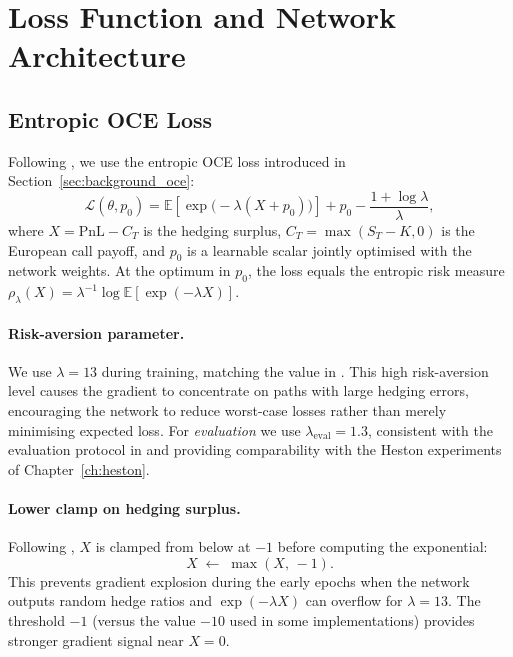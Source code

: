 \section{Loss Function and Network Architecture}%
\label{sec:gad_loss}

\subsection{Entropic OCE Loss}

Following \citet{he2025}, we use the entropic OCE loss introduced in
Section~\ref{sec:background_oce}:
\begin{equation}
  \mathcal{L}(\theta, p_0)
  = \mathbb{E}\!\left[\exp\!\bigl(-\lambda(X + p_0)\bigr)\right]
    + p_0 - \frac{1 + \log\lambda}{\lambda},
  \label{eq:gad_oce_loss}
\end{equation}
where $X = \mathrm{PnL} - C_T$ is the hedging surplus,
$C_T = \max(S_T - K, 0)$ is the European call payoff, and $p_0$ is a
learnable scalar jointly optimised with the network weights.  At the
optimum in $p_0$, the loss equals the entropic risk measure
$\rho_\lambda(X) = \lambda^{-1}\log\mathbb{E}[\exp(-\lambda X)]$.

\paragraph{Risk-aversion parameter.}
We use $\lambda = 13$ during training, matching the value in \citet{he2025}.
This high risk-aversion level causes the gradient to concentrate on paths with
large hedging errors, encouraging the network to reduce worst-case losses rather
than merely minimising expected loss.  For \emph{evaluation} we use
$\lambda_{\mathrm{eval}} = 1.3$, consistent with the evaluation protocol in
\citet{he2025} and providing comparability with the Heston experiments of
Chapter~\ref{ch:heston}.

\paragraph{Lower clamp on hedging surplus.}
Following \citet{he2025}, $X$ is clamped from below at $-1$ before computing
the exponential:
\begin{equation}
  X \;\leftarrow\; \max(X,\, -1).
  \label{eq:xmax}
\end{equation}
This prevents gradient explosion during the early epochs when the network
outputs random hedge ratios and $\exp(-\lambda X)$ can overflow for
$\lambda = 13$.  The threshold $-1$ (versus the value $-10$ used in some
implementations) provides stronger gradient signal near $X = 0$.

